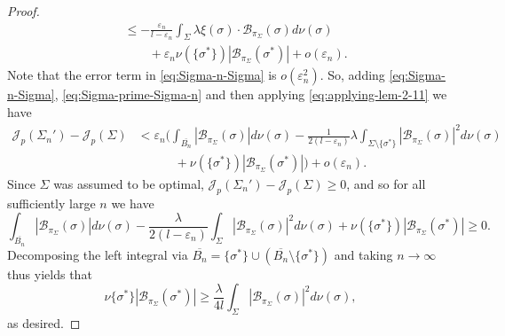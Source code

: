 \documentclass[10pt,a4paper]{amsart}
\renewcommand{\epsilon}{\varepsilon}
\begin{document}
\begin{proof}
\begin{align}
    &\leq -\frac{\epsilon_n}{l-\epsilon_n}\int_\Sigma \lambda
      \xi(\sigma) \cdot \mathcal B_{\pi_\Sigma}(\sigma) d\nu(\sigma)
      \nonumber \\
    &\qquad + \epsilon_n\nu(\{\sigma^*\}) |\mathcal
      B_{\pi_\Sigma}(\sigma^*)| +
      o(\epsilon_n). \label{eq:Sigma-prime-Sigma-n}
  \end{align}
  Note that the error term in \eqref{eq:Sigma-n-Sigma} is
  $o(\epsilon_n^2)$. So, adding \eqref{eq:Sigma-n-Sigma},
  \eqref{eq:Sigma-prime-Sigma-n} and then applying
  \eqref{eq:applying-lem-2-11} we have
  \begin{align*}
    \mathscr{J}_p(\Sigma_n') - \mathscr{J}_p(\Sigma)
    &< \epsilon_n \bigg(\int_{\overline{B_n}}
      |\mathcal{B}_{\pi_{\Sigma}}(\sigma)|d\nu(\sigma) -
      \frac{1}{2(l-\epsilon_n)}\lambda \int_{\Sigma \setminus
      \{\sigma^*\}} |\mathcal{B}_{\pi_{\Sigma}}(\sigma)|^2
      d\nu(\sigma) \\
    &\quad \qquad + \nu(\{\sigma^*\}) |\mathcal
      B_{\pi_\Sigma}(\sigma^*)| \bigg) + o(\epsilon_n).
  \end{align*}
  Since $\Sigma$ was assumed to be optimal, $\mathscr{J}_p(\Sigma_n') -
  \mathscr{J}_p(\Sigma) \geq 0$, and so for all sufficiently large $n$
  we have
  \[
    \int_{\overline{B_n}}|\mathcal{B}_{\pi_{\Sigma}}(\sigma)|d\nu(\sigma)
    - \frac{\lambda}{2(l-\epsilon_n)} \int_{\Sigma }
    |\mathcal{B}_{\pi_{\Sigma}}(\sigma)|^2 d\nu(\sigma) +
    \nu(\{\sigma^*\}) |\mathcal B_{\pi_\Sigma}(\sigma^*)| \geq 0.
  \]
  Decomposing the left integral via $\overline{B_n} = \{\sigma^*\}
  \cup (\overline{B_n} \setminus \{\sigma^*\})$ and taking $n \to
  \infty$ thus yields that
  \[
    \nu\{\sigma^*\}|\mathcal{B}_{\pi_{\Sigma}}(\sigma^*)| \geq
    \frac{\lambda }{4l}\int_{\Sigma }
    |\mathcal{B}_{\pi_{\Sigma}}(\sigma)|^2 d\nu(\sigma),
  \]
  as desired.
\end{proof}
\end{document}
